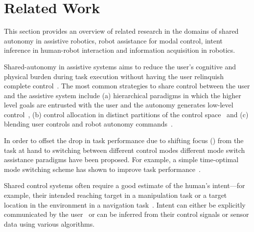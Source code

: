 \documentclass[natbib, twocolumn]{svjour3}          %
\begin{document}
%


\section{Related Work}\label{sec:related-work}
This section provides an overview of related research in the domains of shared autonomy in assistive robotics, robot assistance for modal control, intent inference in human-robot interaction and information acquisition in robotics. 

Shared-autonomy in assistive systems aims to reduce the user's cognitive and physical burden during task execution without having the user relinquish complete control~\citep{philips2007adaptive, demeester2008user, gopinath2017human, muelling2017autonomy}. The most common strategies to share control between the user and the assistive system include (a) hierarchical paradigms in which the higher level goals are entrusted with the user and the autonomy generates low-level control~\citep{tsui2011want, kim2010relationship, kim2012autonomy}, (b) control allocation in distinct partitions of the control space~\citep{driessen2005collaborative} and (c) blending user controls and robot autonomy commands~\citep{downey2016blending, storms2014blending, muelling2017autonomy}. 

In order to offset the drop in task performance due to shifting focus () from the task at hand to switching between different control modes different mode switch assistance paradigms have been proposed. For example, a simple time-optimal mode switching scheme has shown to improve task performance~\citep{herlant2016assistive, pilarski2012dynamic}. 


Shared control systems often require a good estimate of the human's intent---for example, their intended reaching target in a manipulation task or a target location in the environment in a navigation task~\citep{liu2016goal}. Intent can either be explicitly communicated by the user~\citep{choi2008laser} or can be inferred from their control signals or sensor data using various algorithms. 
\end{document}
